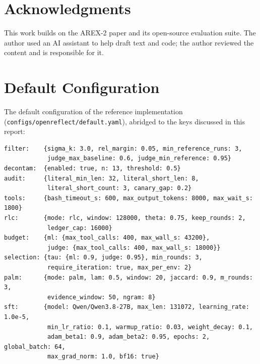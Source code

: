 \documentclass[11pt]{article}
\newcommand{\code}[1]{\texttt{#1}}
\begin{document}
\section*{Acknowledgments}
This work builds on the AREX-2 paper and its open-source evaluation suite. The author used an AI assistant to help draft text and code; the author reviewed the content and is responsible for it.




\appendix
\section{Default Configuration}
\label{app:config}
The default configuration of the reference implementation (\code{configs/openreflect/default.yaml}), abridged to the keys discussed in this report:
\begin{small}
\begin{verbatim}
filter:    {sigma_k: 3.0, rel_margin: 0.05, min_reference_runs: 3,
            judge_max_baseline: 0.6, judge_min_reference: 0.95}
decontam:  {enabled: true, n: 13, threshold: 0.5}
audit:     {literal_min_len: 32, literal_short_len: 8,
            literal_short_count: 3, canary_gap: 0.2}
tools:     {bash_timeout_s: 600, max_output_tokens: 8000, max_wait_s: 1800}
rlc:       {mode: rlc, window: 128000, theta: 0.75, keep_rounds: 2,
            ledger_cap: 16000}
budget:    {ml: {max_tool_calls: 400, max_wall_s: 43200},
            judge: {max_tool_calls: 400, max_wall_s: 18000}}
selection: {tau: {ml: 0.9, judge: 0.95}, min_rounds: 3,
            require_iteration: true, max_per_env: 2}
palm:      {mode: palm, lam: 0.5, window: 20, jaccard: 0.9, m_rounds: 3,
            evidence_window: 50, ngram: 8}
sft:       {model: Qwen/Qwen3.8-27B, max_len: 131072, learning_rate: 1.0e-5,
            min_lr_ratio: 0.1, warmup_ratio: 0.03, weight_decay: 0.1,
            adam_beta1: 0.9, adam_beta2: 0.95, epochs: 2, global_batch: 64,
            max_grad_norm: 1.0, bf16: true}
\end{verbatim}
\end{small}
\end{document}
